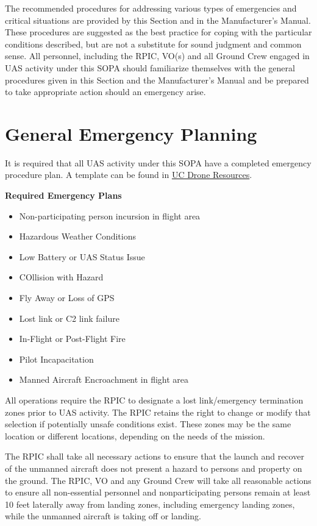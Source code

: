 \documentclass[
]{book}
\providecommand{\tightlist}{%
  \setlength{\itemsep}{0pt}\setlength{\parskip}{0pt}}
\begin{document}
The recommended procedures for addressing various types of emergencies and critical situations are provided by this Section and in the Manufacturer's Manual. These procedures are suggested as the best practice for coping with the particular conditions described, but are not a substitute for sound judgment and common sense. All personnel, including the RPIC, VO(s) and all Ground Crew engaged in UAS activity under this SOPA should familiarize themselves with the general procedures given in this Section and the Manufacturer's Manual and be prepared to take appropriate action should an emergency arise.

\section{General Emergency Planning}\label{general-emergency-planning}

It is required that all UAS activity under this SOPA have a completed emergency procedure plan. A template can be found in \href{https://ucdrones.github.io/ch-resources.html}{UC Drone Resources}.

\textbf{Required Emergency Plans}

\begin{itemize}
\tightlist
\item
  Non-participating person incursion in flight area
\item
  Hazardous Weather Conditions
\item
  Low Battery or UAS Status Issue
\item
  COllision with Hazard
\item
  Fly Away or Loss of GPS
\item
  Lost link or C2 link failure
\item
  In-Flight or Post-Flight Fire
\item
  Pilot Incapacitation
\item
  Manned Aircraft Encroachment in flight area
\end{itemize}

All operations require the RPIC to designate a lost link/emergency termination zones prior to UAS activity. The RPIC retains the right to change or modify that selection if potentially unsafe conditions exist. These zones may be the same location or different locations, depending on the needs of the mission.

The RPIC shall take all necessary actions to ensure that the launch and recover of the unmanned aircraft does not present a hazard to persons and property on the ground. The RPIC, VO and any Ground Crew will take all reasonable actions to ensure all non-essential personnel and nonparticipating persons remain at least 10 feet laterally away from landing zones, including emergency landing zones, while the unmanned aircraft is taking off or landing.
\end{document}
